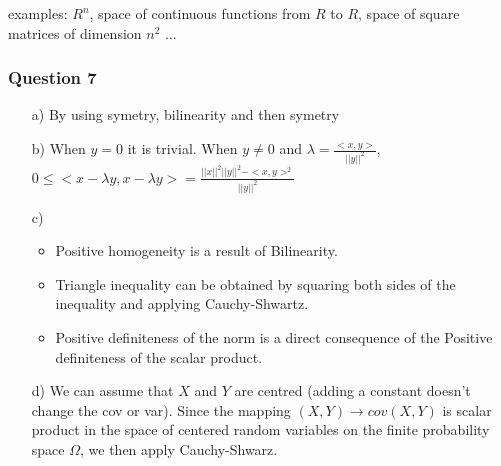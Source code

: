 \documentclass[12pt]{article}
\newcommand{\Q}[1]{\subsubsection*{Question #1}}
\begin{document}
examples: $R^n$, space of continuous functions from $R$ to $R$, space of square matrices of dimension $n^2$ ...
\Q{7}
\begin{itemize}
\item [a)] By using symetry, bilinearity and then symetry
\item [b)] When $y = 0$ it is trivial. When $y \neq 0$ and $\lambda = \frac{<x,y>}{||y||^2}$, $0 \leq <x - \lambda y, x - \lambda y> = \frac{||x||^2 ||y||^2 - <x, y>^2}{||y||^2} $

\item [c)]
  \begin{itemize}
  \item Positive homogeneity is a result of Bilinearity.
  \item Triangle inequality can be obtained by squaring both sides of the inequality and applying Cauchy-Shwartz.
  \item Positive definiteness of the norm is a direct consequence of the Positive definiteness of the scalar product.
  \end{itemize}
  
  \item [d)] We can assume that $X$ and $Y$ are centred (adding a constant doesn't change the cov or var). Since the mapping $(X, Y) \longrightarrow cov(X, Y)$ is scalar product in the space of centered random variables on the finite probability space $\Omega$, we then apply Cauchy-Shwarz.
  \end{itemize}
\end{document}
